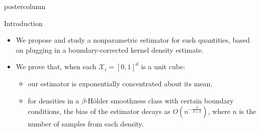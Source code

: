 \documentclass[final,hyperref={pdfpagelabels=false}]{beamer}
\newcommand{\R}{\mathbb{R}}
\newcommand{\X}{\mathcal{X}}
\begin{document}
\begin{frame}
\begin{columns}
\begin{column}{.32\textwidth}
\begin{beamercolorbox}[center,wd=\textwidth]{postercolumn}
\begin{minipage}[T]{.95\textwidth}
{\begin{block}{Introduction}
\begin{itemize}
              \item We propose and study a nonparametric estimator for such
                    quantities, based on plugging in a boundary-corrected
                    kernel density estimate.
              \item We prove that, when each $\X_i = [0,1]^d$ is a unit cube:
                \begin{itemize}
                \item our estimator is exponentially concentrated about its
                      mean.
                \item for densities in a $\beta$-H\"older smoothness class with
                      certain boundary conditions, the bias of the estimator
                      decays as $O\left(n^{-\frac{\beta}{\beta + d}}\right)$,
                      where $n$ is the number of samples from each density.
                \end{itemize}
              \end{itemize}
            \end{block}
}
\end{minipage}
\end{beamercolorbox}
\end{column}
\end{columns}
\end{frame}
\end{document}
